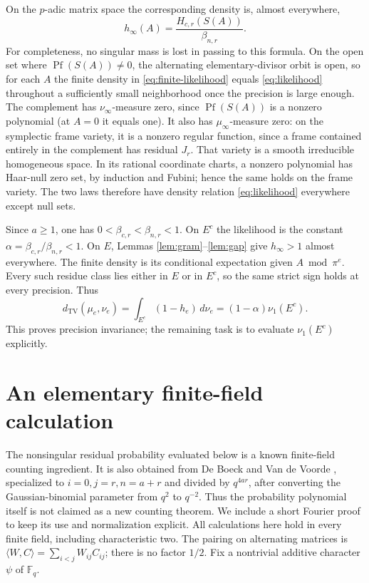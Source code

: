 \documentclass[11pt]{article}
\newcommand{\F}{\mathbb F}
\newcommand{\TV}{d_{\mathrm{TV}}}
\newcommand{\Pf}{\operatorname{Pf}}
\begin{document}
On the $p$-adic matrix space the corresponding density is, almost everywhere,
\begin{equation}\label{eq:likelihood}
 h_\infty(A)=\frac{H_{c,r}(S(A))}{\beta_{n,r}}.
\end{equation}
For completeness, no singular mass is lost in passing to this formula. On the open set where $\Pf(S(A))\ne0$, the alternating elementary-divisor orbit is open, so for each $A$ the finite density in \eqref{eq:finite-likelihood} equals \eqref{eq:likelihood} throughout a sufficiently small neighborhood once the precision is large enough. The complement has $\nu_\infty$-measure zero, since $\Pf(S(A))$ is a nonzero polynomial (at $A=0$ it equals one). It also has $\mu_\infty$-measure zero: on the symplectic frame variety, it is a nonzero regular function, since a frame contained entirely in the complement has residual $J_r$. That variety is a smooth irreducible homogeneous space. In its rational coordinate charts, a nonzero polynomial has Haar-null zero set, by induction and Fubini; hence the same holds on the frame variety. The two laws therefore have density relation \eqref{eq:likelihood} everywhere except null sets.

Since $a\ge1$, one has $0<\beta_{c,r}<\beta_{n,r}<1$. On $E^c$ the likelihood is the constant
$\alpha=\beta_{c,r}/\beta_{n,r}<1$. On $E$, Lemmas \ref{lem:gram}--\ref{lem:gap} give $h_\infty>1$ almost everywhere. The finite density is its conditional expectation given $A\bmod\pi^e$. Every such residue class lies either in $E$ or in $E^c$, so the same strict sign holds at every precision. Thus
\begin{equation}\label{eq:tv-reduction}
 \TV(\mu_e,\nu_e)=\int_{E^c}(1-h_e)\,d\nu_e
 =(1-\alpha)\nu_1(E^c).
\end{equation}
This proves precision invariance; the remaining task is to evaluate $\nu_1(E^c)$ explicitly.

\section{An elementary finite-field calculation}
The nonsingular residual probability evaluated below is a known finite-field counting ingredient. It is also obtained from De Boeck and Van de Voorde \cite[Theorem 4.6]{deboeck}, specialized to $i=0,j=r,n=a+r$ and divided by $q^{4ar}$, after converting the Gaussian-binomial parameter from $q^2$ to $q^{-2}$. Thus the probability polynomial itself is not claimed as a new counting theorem. We include a short Fourier proof to keep its use and normalization explicit.
All calculations here hold in every finite field, including characteristic two. The pairing on alternating matrices is
$\langle W,C\rangle=\sum_{i<j}W_{ij}C_{ij}$; there is no factor $1/2$. Fix a nontrivial additive character $\psi$ of $\F_q$.
\end{document}
